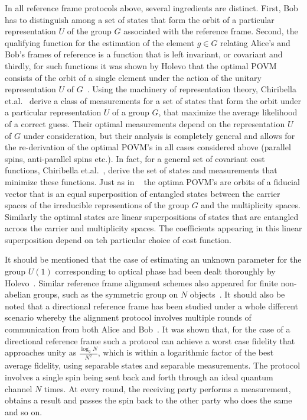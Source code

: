 \documentclass{article}
\begin{document}
In all reference frame protocols above, several ingredients are distinct.  First, Bob has to distinguish among a set of states that form the orbit of a particular representation $U$ of the group $G$ associated with the reference frame.  Second, the qualifying function for the estimation of the element $g\in G$ relating Alice's and Bob's frames of reference is a function that is left invariant, or covariant and thirdly, for such functions it was shown by Holevo that the optimal POVM consists of the orbit of a single element under the action of the unitary representation $U$ of $G$~\cite{H80}.  Using the machinery of representation theory, Chiribella et.al.~\cite{CDPS04b} derive a class of measurements for a set of states that form the orbit under a particular representation $U$ of a group $G$, that maximize the average likelihood of a correct guess. Their optimal measurements depend on the representation $U$ of $G$ under consideration, but their analysis is completely general and allows for the re-derivation of the optimal POVM's in all cases considered above (parallel spins, anti-parallel spins etc.).  In fact, for a general set of covariant cost functions, Chiribella et.al.~\cite{CDS05}, derive the set of states and measurements that minimize these functions.  Just as in ~\cite{CDPS04b} the optima POVM's are orbits of a fiducial vector that is an equal superposition of entangled states between the carrier spaces of the irreducible representions of the group $G$ and the multiplicity spaces.  Similarly the optimal states are linear superpositions of states that are entangled acroos the carrier and multiplicity spaces.  The coefficients appearing in this linear superposition depend on teh particular choice of cost function.

It should be mentioned that the case of estimating an unknown parameter for the group $U(1)$ corresponding to optical phase had been dealt thoroughly by Holevo~\cite{H80}.  Similar reference frame alignment schemes also appeared for finite non-abelian groups, such as the symmetric group on $N$ objects~\cite{KK04}.  It should also be noted that a directional reference frame has been studied under a whole different scenario whereby the alignment protocol involves multiple rounds of communication from both Alice and Bob~\cite{RG03}.  It was shown that, for the case of a directional reference frame such a protocol can achieve a worst case fidelity that approaches unity as $\frac{\log_2 N}{N^2}$, which is within a logarithmic factor of the best average fidelity, using separable states and separable measurements.  The protocol involves a single spin being sent back and forth through an ideal quantum channel $N$ times.  At every round, the receiving party performs a measurement, obtains a result and passes the spin back to the other party who does the same and so on.  
\end{document}
